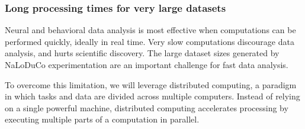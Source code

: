 \documentclass[12pt]{article}
\begin{document}

\subsubsection*{Long processing times for very large datasets}

Neural and behavioral data analysis is most effective when computations can be
performed quickly, ideally in real time. Very slow computations discourage data
analysis, and hurts scientific discovery. The large dataset sizes generated by
NaLoDuCo experimentation are an important challenge for fast data analysis.

To overcome this limitation, we will leverage distributed computing, a paradigm
in which tasks and data are divided across multiple computers. Instead of
relying on a single powerful machine, distributed computing accelerates
processing by executing multiple parts of a computation in parallel.
\end{document}
